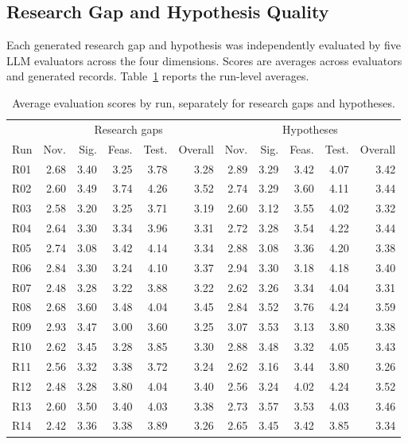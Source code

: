 \documentclass[sigconf,review,anonymous=false]{acmart}
\begin{document}
\subsection{Research Gap and Hypothesis Quality}
Each generated research gap and hypothesis was independently evaluated by five LLM evaluators across the four dimensions. Scores are averages across evaluators and generated records. Table~\ref{tab:scores} reports the run-level averages.
\begin{table}[t]
\caption{Average evaluation scores by run, separately for research gaps and hypotheses.}
\label{tab:scores}
\centering\scriptsize
\begin{tabular}{lrrrrr rrrrr}
\toprule
& \multicolumn{5}{c}{Research gaps} & \multicolumn{5}{c}{Hypotheses} \\
\cmidrule(lr){2-6}\cmidrule(lr){7-11}
Run & Nov. & Sig. & Feas. & Test. & Overall & Nov. & Sig. & Feas. & Test. & Overall \\
\midrule
R01 & 2.68 & 3.40 & 3.25 & 3.78 & 3.28 & 2.89 & 3.29 & 3.42 & 4.07 & 3.42 \\
R02 & 2.60 & 3.49 & 3.74 & 4.26 & 3.52 & 2.74 & 3.29 & 3.60 & 4.11 & 3.44 \\
R03 & 2.58 & 3.20 & 3.25 & 3.71 & 3.19 & 2.60 & 3.12 & 3.55 & 4.02 & 3.32 \\
R04 & 2.64 & 3.30 & 3.34 & 3.96 & 3.31 & 2.72 & 3.28 & 3.54 & 4.22 & 3.44 \\
R05 & 2.74 & 3.08 & 3.42 & 4.14 & 3.34 & 2.88 & 3.08 & 3.36 & 4.20 & 3.38 \\
R06 & 2.84 & 3.30 & 3.24 & 4.10 & 3.37 & 2.94 & 3.30 & 3.18 & 4.18 & 3.40 \\
R07 & 2.48 & 3.28 & 3.22 & 3.88 & 3.22 & 2.62 & 3.26 & 3.34 & 4.04 & 3.31 \\
R08 & 2.68 & 3.60 & 3.48 & 4.04 & 3.45 & 2.84 & 3.52 & 3.76 & 4.24 & 3.59 \\
R09 & 2.93 & 3.47 & 3.00 & 3.60 & 3.25 & 3.07 & 3.53 & 3.13 & 3.80 & 3.38 \\
R10 & 2.62 & 3.45 & 3.28 & 3.85 & 3.30 & 2.88 & 3.48 & 3.32 & 4.05 & 3.43 \\
R11 & 2.56 & 3.32 & 3.38 & 3.72 & 3.24 & 2.62 & 3.16 & 3.44 & 3.80 & 3.26 \\
R12 & 2.48 & 3.28 & 3.80 & 4.04 & 3.40 & 2.56 & 3.24 & 4.02 & 4.24 & 3.52 \\
R13 & 2.60 & 3.50 & 3.40 & 4.03 & 3.38 & 2.73 & 3.57 & 3.53 & 4.03 & 3.46 \\
R14 & 2.42 & 3.36 & 3.38 & 3.89 & 3.26 & 2.65 & 3.45 & 3.42 & 3.85 & 3.34 \\
\bottomrule
\end{tabular}
\end{table}
\end{document}
